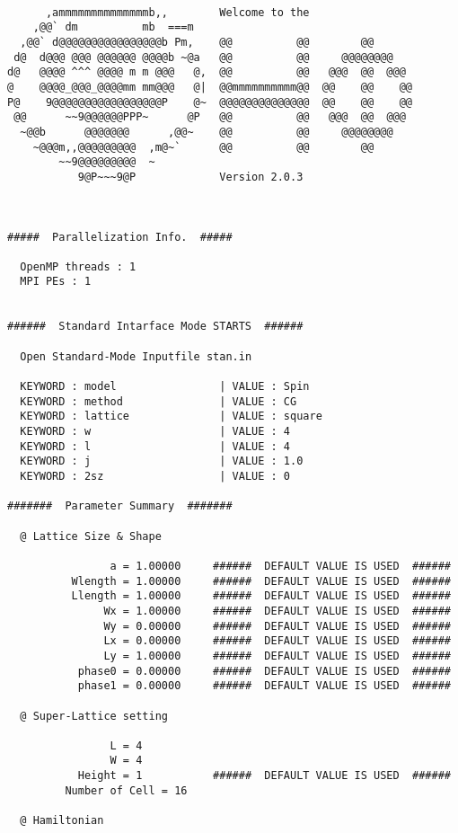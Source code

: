 \small
\begin{verbatim}

      ,ammmmmmmmmmmmmmb,,        Welcome to the
    ,@@` dm          mb  ===m
  ,@@` d@@@@@@@@@@@@@@@@b Pm,    @@          @@        @@
 d@  d@@@ @@@ @@@@@@ @@@@b ~@a   @@          @@     @@@@@@@@
d@   @@@@ ^^^ @@@@ m m @@@   @,  @@          @@   @@@  @@  @@@
@    @@@@_@@@_@@@@mm mm@@@   @|  @@mmmmmmmmmm@@  @@    @@    @@
P@    9@@@@@@@@@@@@@@@@@P    @~  @@@@@@@@@@@@@@  @@    @@    @@
 @@      ~~9@@@@@@PPP~      @P   @@          @@   @@@  @@  @@@
  ~@@b      @@@@@@@      ,@@~    @@          @@     @@@@@@@@
    ~@@@m,,@@@@@@@@@  ,m@~`      @@          @@        @@
        ~~9@@@@@@@@@  ~
           9@P~~~9@P             Version 2.0.3



#####  Parallelization Info.  #####

  OpenMP threads : 1
  MPI PEs : 1


######  Standard Intarface Mode STARTS  ######

  Open Standard-Mode Inputfile stan.in

  KEYWORD : model                | VALUE : Spin
  KEYWORD : method               | VALUE : CG
  KEYWORD : lattice              | VALUE : square
  KEYWORD : w                    | VALUE : 4
  KEYWORD : l                    | VALUE : 4
  KEYWORD : j                    | VALUE : 1.0
  KEYWORD : 2sz                  | VALUE : 0

#######  Parameter Summary  #######

  @ Lattice Size & Shape

                a = 1.00000     ######  DEFAULT VALUE IS USED  ######
          Wlength = 1.00000     ######  DEFAULT VALUE IS USED  ######
          Llength = 1.00000     ######  DEFAULT VALUE IS USED  ######
               Wx = 1.00000     ######  DEFAULT VALUE IS USED  ######
               Wy = 0.00000     ######  DEFAULT VALUE IS USED  ######
               Lx = 0.00000     ######  DEFAULT VALUE IS USED  ######
               Ly = 1.00000     ######  DEFAULT VALUE IS USED  ######
           phase0 = 0.00000     ######  DEFAULT VALUE IS USED  ######
           phase1 = 0.00000     ######  DEFAULT VALUE IS USED  ######

  @ Super-Lattice setting

                L = 4
                W = 4
           Height = 1           ######  DEFAULT VALUE IS USED  ######
         Number of Cell = 16

  @ Hamiltonian


\end{verbatim}
